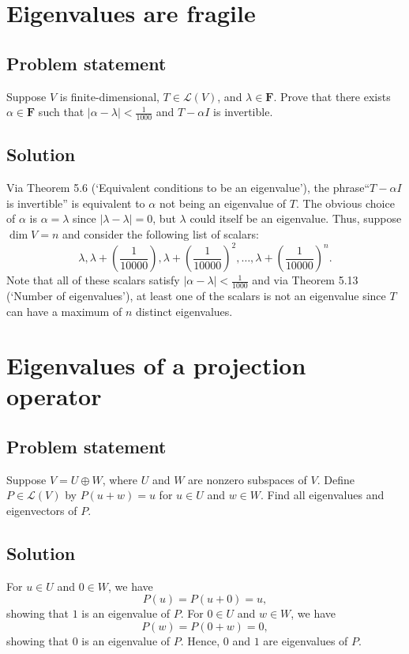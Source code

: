 \documentclass{article}
\begin{document}
\clearpage

\section{Eigenvalues are fragile}
\subsection*{Problem statement}
Suppose $V$ is finite-dimensional, $T\in\mathcal{L}(V)$, and $\lambda\in\mathbf{F}$. 
Prove that there exists $\alpha\in\mathbf{F}$ such that $|\alpha-\lambda|<\frac{1}{1000}$ and $T-\alpha I$ is invertible.

\subsection*{Solution}
Via Theorem 5.6 (`Equivalent conditions to be an eigenvalue'), the phrase\newline ``$T-\alpha I$ is invertible'' is equivalent to $\alpha$ not being an eigenvalue of $T$. 
The obvious choice of $\alpha$ is $\alpha=\lambda$ since $|\lambda-\lambda|=0$, but $\lambda$ could itself be an eigenvalue. 
Thus, suppose $\dim V=n$ and consider the following list of scalars:
\[\lambda,\lambda+(\frac{1}{10000}),\lambda+(\frac{1}{10000})^2,\ldots,\lambda+(\frac{1}{10000})^n.\]
Note that all of these scalars satisfy $|\alpha-\lambda|<\frac{1}{1000}$ and via Theorem 5.13 (`Number of eigenvalues'), at least one of the scalars is not an eigenvalue since $T$ can have a maximum of $n$ distinct eigenvalues.

\clearpage

\section{Eigenvalues of a projection operator}
\subsection*{Problem statement}
Suppose $V=U\oplus W$, where $U$ and $W$ are nonzero subspaces of $V$. 
Define $P\in\mathcal{L}(V)$ by $P(u+w)=u$ for $u\in U$ and $w\in W$. 
Find all eigenvalues and eigenvectors of $P$.

\subsection*{Solution}
For $u\in U$ and $0\in W$, we have 
\[P(u)=P(u+0)=u,\]
showing that $1$ is an eigenvalue of $P$. 
For $0\in U$ and $w\in W$, we have
\[P(w)=P(0+w)=0,\]
showing that $0$ is an eigenvalue of $P$. 
Hence, $0$ and $1$ are eigenvalues of $P$.
\end{document}
